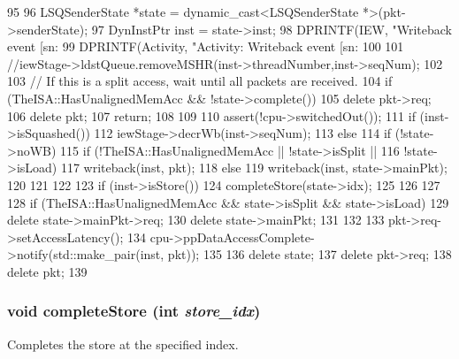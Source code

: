 \begin{DoxyCode}
95 {
96     LSQSenderState *state = dynamic_cast<LSQSenderState *>(pkt->senderState);
97     DynInstPtr inst = state->inst;
98     DPRINTF(IEW, "Writeback event [sn:%
99     DPRINTF(Activity, "Activity: Writeback event [sn:%
100 
101     //iewStage->ldstQueue.removeMSHR(inst->threadNumber,inst->seqNum);
102 
103     // If this is a split access, wait until all packets are received.
104     if (TheISA::HasUnalignedMemAcc && !state->complete()) {
105         delete pkt->req;
106         delete pkt;
107         return;
108     }
109 
110     assert(!cpu->switchedOut());
111     if (inst->isSquashed()) {
112         iewStage->decrWb(inst->seqNum);
113     } else {
114         if (!state->noWB) {
115             if (!TheISA::HasUnalignedMemAcc || !state->isSplit ||
116                 !state->isLoad) {
117                 writeback(inst, pkt);
118             } else {
119                 writeback(inst, state->mainPkt);
120             }
121         }
122 
123         if (inst->isStore()) {
124             completeStore(state->idx);
125         }
126     }
127 
128     if (TheISA::HasUnalignedMemAcc && state->isSplit && state->isLoad) {
129         delete state->mainPkt->req;
130         delete state->mainPkt;
131     }
132 
133     pkt->req->setAccessLatency();
134     cpu->ppDataAccessComplete->notify(std::make_pair(inst, pkt));
135 
136     delete state;
137     delete pkt->req;
138     delete pkt;
139 }
\end{DoxyCode}
\hypertarget{classLSQUnit_a12ec7cad6ac51a53bca7795588885e5c}{
\subsubsection[{completeStore}]{\setlength{\rightskip}{0pt plus 5cm}void completeStore (int {\em store\_\-idx})}}
\label{classLSQUnit_a12ec7cad6ac51a53bca7795588885e5c}
Completes the store at the specified index. 


